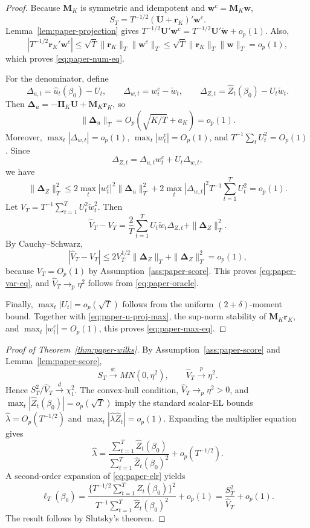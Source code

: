 \documentclass[11pt]{article}
\begin{document}
\begin{proof}
Because \(\bm M_K\) is symmetric and idempotent and \(\bm w^c=\bm M_K\bm w\),
\[
    S_T=T^{-1/2}(\bm U+\bm r_K)'\bm w^c.
\]
Lemma~\ref{lem:paper-projection} gives \(T^{-1/2}\bm U'\bm w^c=T^{-1/2}\bm U'\widetilde{\bm w}+o_p(1)\). Also,
\[
    |T^{-1/2}\bm r_K'\bm w^c|
      \leq \sqrt T\|\bm r_K\|_T\|\bm w^c\|_T
      \leq \sqrt T\|\bm r_K\|_T\|\bm w\|_T=o_p(1),
\]
which proves \eqref{eq:paper-num-eq}.

For the denominator, define
\[
    \Delta_{u,t}=\widehat u_t(\beta_0)-U_t,
    \qquad
    \Delta_{w,t}=w_t^c-\widetilde w_t,
    \qquad
    \Delta_{Z,t}=\widehat Z_t(\beta_0)-U_t\widetilde w_t.
\]
Then \(\bm\Delta_u=-\bm\Pi_K\bm U+\bm M_K\bm r_K\), so
\[
    \|\bm\Delta_u\|_T=O_p(\sqrt{K/T}+a_K)=o_p(1).
\]
Moreover, \(\max_t|\Delta_{w,t}|=o_p(1)\), \(\max_t|w_t^c|=O_p(1)\), and \(T^{-1}\sum_tU_t^2=O_p(1)\). Since
\[
    \Delta_{Z,t}=\Delta_{u,t}w_t^c+U_t\Delta_{w,t},
\]
we have
\[
    \|\bm\Delta_Z\|_T^2
    \leq 2\max_t|w_t^c|^2\|\bm\Delta_u\|_T^2
      +2\max_t|\Delta_{w,t}|^2T^{-1}\sum_{t=1}^TU_t^2=o_p(1).
\]
Let \(V_T=T^{-1}\sum_{t=1}^TU_t^2\widetilde w_t^2\). Then
\[
    \widehat V_T-V_T
      =\frac2T\sum_{t=1}^TU_t\widetilde w_t\Delta_{Z,t}
       +\|\bm\Delta_Z\|_T^2.
\]
By Cauchy--Schwarz,
\[
    |\widehat V_T-V_T|
      \leq 2V_T^{1/2}\|\bm\Delta_Z\|_T+\|\bm\Delta_Z\|_T^2=o_p(1),
\]
because \(V_T=O_p(1)\) by Assumption~\ref{ass:paper-score}. This proves \eqref{eq:paper-var-eq}, and \(\widehat V_T\to_p\eta^2\) follows from \eqref{eq:paper-oracle}.

Finally, \(\max_t|U_t|=o_p(\sqrt T)\) follows from the uniform \((2+\delta)\)-moment bound. Together with \eqref{eq:paper-u-proj-max}, the sup-norm stability of \(\bm M_K\bm r_K\), and \(\max_t|w_t^c|=O_p(1)\), this proves \eqref{eq:paper-max-eq}.
\end{proof}

\begin{proof}[Proof of Theorem~\ref{thm:paper-wilks}]
By Assumption~\ref{ass:paper-score} and Lemma~\ref{lem:paper-score},
\[
    S_T\xrightarrow{\mathrm{st}}MN(0,\eta^2),
    \qquad
    \widehat V_T\xrightarrow{p}\eta^2.
\]
Hence \(S_T^2/\widehat V_T\xrightarrow{d}\chi_1^2\). The convex-hull condition, \(\widehat V_T\to_p\eta^2>0\), and \(\max_t|\widehat Z_t(\beta_0)|=o_p(\sqrt T)\) imply the standard scalar-EL bounds \(\widehat\lambda=O_p(T^{-1/2})\) and \(\max_t|\widehat\lambda\widehat Z_t|=o_p(1)\). Expanding the multiplier equation gives
\[
    \widehat\lambda
      =\frac{\sum_{t=1}^T\widehat Z_t(\beta_0)}
             {\sum_{t=1}^T\widehat Z_t(\beta_0)^2}
       +o_p(T^{-1/2}).
\]
A second-order expansion of \eqref{eq:paper-elr} yields
\[
    \ell_T(\beta_0)
      =\frac{\{T^{-1/2}\sum_{t=1}^T\widehat Z_t(\beta_0)\}^2}
             {T^{-1}\sum_{t=1}^T\widehat Z_t(\beta_0)^2}
       +o_p(1)
      =\frac{S_T^2}{\widehat V_T}+o_p(1).
\]
The result follows by Slutsky's theorem.
\end{proof}
\end{document}
